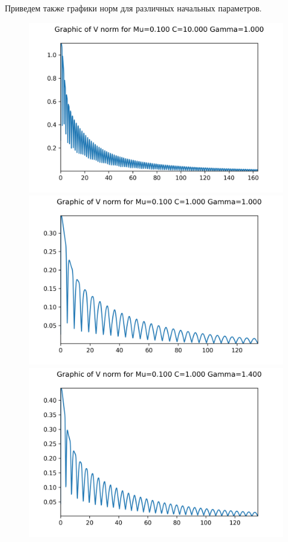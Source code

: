 \newpage
Приведем также графики норм для различных начальных параметров.
\begin{figure}[H]
	\centering
	\includegraphics[scale=0.65]{../graphs_data_nonsmooth_1/norms/Graph_V_norms_mu0.100_C10.000_gamma1.000.png}
	\includegraphics[scale=0.65]{../graphs_data_nonsmooth_1/norms/Graph_V_norms_mu0.100_C1.000_gamma1.000.png}	
	\includegraphics[scale=0.65]{../graphs_data_nonsmooth_1/norms/Graph_V_norms_mu0.100_C1.000_gamma1.400.png}
\end{figure}


